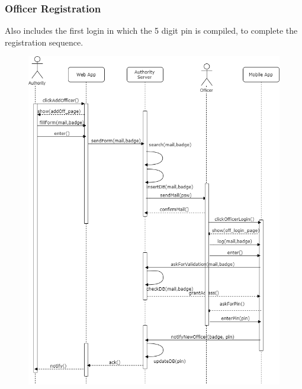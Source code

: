 \documentclass[12pt,a4paper]{article}
\begin{document}
		\subsubsection{Officer Registration}
Also includes the first login in which the 5 digit pin is compiled, to complete the registration sequence.
			\begin{figure}[H]
				\centering
				\includegraphics[width=.9\textwidth,height=.9\textheight,keepaspectratio]{Images/Off_registration}
				\label{fig:login_sequence}
			\end{figure}
\end{document}
